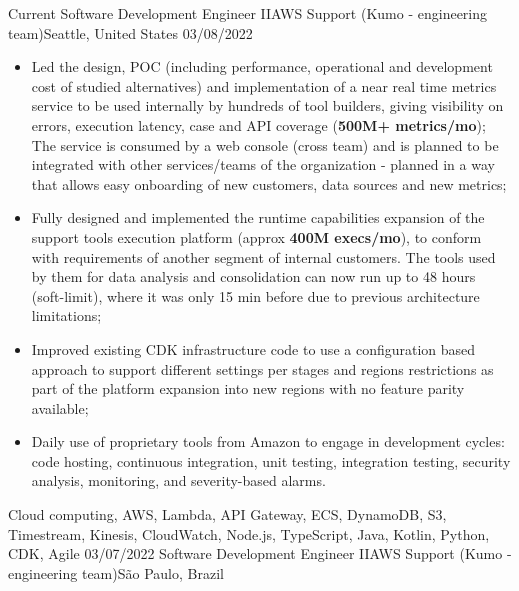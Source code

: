 %
%
%

\begin{experiences}
  \experience
    {Current}   {Software Development Engineer II}{AWS Support (Kumo - engineering team)}{Seattle, United States}
    {03/08/2022} {
    \begin{itemize}
      \item Led the design, POC (including performance, operational and development cost of studied alternatives) and implementation of a near real time metrics service to be used internally by hundreds of tool builders, giving visibility on errors, execution latency, case and API coverage (\textbf{500M+ metrics/mo}); The service is consumed by a web console (cross team) and is planned to be integrated with other services/teams of the organization - planned in a way that allows easy onboarding of new customers, data sources and new metrics;
      \item Fully designed and implemented the runtime capabilities expansion of the support tools execution platform (approx \textbf{400M execs/mo}), to conform with requirements of another segment of internal customers. The tools used by them for data analysis and consolidation can now run up to 48 hours (soft-limit), where it was only 15 min before due to previous architecture limitations;
      \item Improved existing CDK infrastructure code to use a configuration based approach to support different settings per stages and regions restrictions as part of the platform expansion into new regions with no feature parity available;
      \item Daily use of proprietary tools from Amazon to engage in development cycles: code hosting, continuous integration, unit testing, integration testing, security analysis, monitoring, and severity-based alarms.
    \end{itemize}
  }
  {Cloud computing, AWS, Lambda, API Gateway, ECS, DynamoDB, S3, Timestream, Kinesis, CloudWatch, Node.js, TypeScript, Java, Kotlin, Python, CDK, Agile }
  \emptySeparator
  \experience
    {03/07/2022}   {Software Development Engineer II}{AWS Support (Kumo - engineering team)}{São Paulo, Brazil}

\end{experiences}
